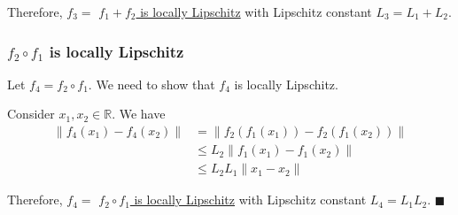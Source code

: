 Therefore, \( f_3 = \) \underline{\( f_1 + f_2 \) is locally Lipschitz} with Lipschitz constant \( L_3 = L_1 + L_2 \).

\subsubsection*{\( f_2 \circ f_1 \) is locally Lipschitz}

Let \( f_4 = f_2 \circ f_1 \).
We need to show that \( f_4 \) is locally Lipschitz.

Consider \( x_1, x_2 \in \mathbb{R} \).
We have
\begin{align*}
    \lVert f_4(x_1) - f_4(x_2) \rVert
     & =
    \lVert f_2(f_1(x_1)) - f_2(f_1(x_2)) \rVert
    \\ & \leq
    L_2 \lVert f_1(x_1) - f_1(x_2) \rVert
    \\ & \leq
    L_2 L_1 \lVert x_1 - x_2 \rVert
\end{align*}

Therefore, \( f_4 = \) \underline{\( f_2 \circ f_1 \) is locally Lipschitz} with Lipschitz constant \( L_4 = L_1 L_2 \).
\hfill \( \blacksquare \)
